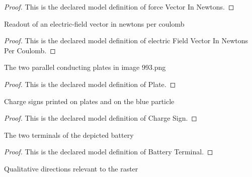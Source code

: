 \begin{proof}
  This is the declared model definition of force Vector In Newtons.
\end{proof}
\begin{definition}
  \label{def:physics:phyx-mini-0993:phyxminiproblems-problemphyxmini0993-electricfieldvectorinnewtonspercoulomb}
  Readout of an electric-field vector in newtons per coulomb
\end{definition}
\begin{proof}
  This is the declared model definition of electric Field Vector In Newtons Per Coulomb.
\end{proof}
\begin{definition}[Plate]
  \label{def:physics:phyx-mini-0993:phyxminiproblems-problemphyxmini0993-plate}
  The two parallel conducting plates in image 993.png
\end{definition}
\begin{proof}
  This is the declared model definition of Plate.
\end{proof}
\begin{definition}
  \label{def:physics:phyx-mini-0993:phyxminiproblems-problemphyxmini0993-chargesign}
  Charge signs printed on plates and on the blue particle
\end{definition}
\begin{proof}
  This is the declared model definition of Charge Sign.
\end{proof}
\begin{definition}
  \label{def:physics:phyx-mini-0993:phyxminiproblems-problemphyxmini0993-batteryterminal}
  The two terminals of the depicted battery
\end{definition}
\begin{proof}
  This is the declared model definition of Battery Terminal.
\end{proof}
\begin{definition}
  \label{def:physics:phyx-mini-0993:phyxminiproblems-problemphyxmini0993-figuredirection}
  Qualitative directions relevant to the raster
\end{definition}
